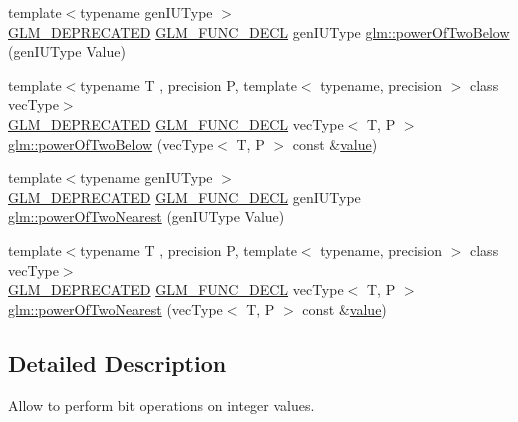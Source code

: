 \begin{DoxyCompactItemize}
\item 
{\footnotesize template$<$typename gen\+I\+U\+Type $>$ }\\\mbox{\hyperlink{setup_8hpp_a8edfb48cdc249a3ee48406bf179023dc}{G\+L\+M\+\_\+\+D\+E\+P\+R\+E\+C\+A\+T\+ED}} \mbox{\hyperlink{setup_8hpp_ab2d052de21a70539923e9bcbf6e83a51}{G\+L\+M\+\_\+\+F\+U\+N\+C\+\_\+\+D\+E\+CL}} gen\+I\+U\+Type \mbox{\hyperlink{group__gtx__bit_ga3de7df63c589325101a2817a56f8e29d}{glm\+::power\+Of\+Two\+Below}} (gen\+I\+U\+Type Value)
\item 
{\footnotesize template$<$typename T , precision P, template$<$ typename, precision $>$ class vec\+Type$>$ }\\\mbox{\hyperlink{setup_8hpp_a8edfb48cdc249a3ee48406bf179023dc}{G\+L\+M\+\_\+\+D\+E\+P\+R\+E\+C\+A\+T\+ED}} \mbox{\hyperlink{setup_8hpp_ab2d052de21a70539923e9bcbf6e83a51}{G\+L\+M\+\_\+\+F\+U\+N\+C\+\_\+\+D\+E\+CL}} vec\+Type$<$ T, P $>$ \mbox{\hyperlink{group__gtx__bit_gae33bb1ca2b55846b23a0f0796a679195}{glm\+::power\+Of\+Two\+Below}} (vec\+Type$<$ T, P $>$ const \&\mbox{\hyperlink{glad_8h_a03aff08f73d7fde3d1a08e0abd8e84fa}{value}})
\item 
{\footnotesize template$<$typename gen\+I\+U\+Type $>$ }\\\mbox{\hyperlink{setup_8hpp_a8edfb48cdc249a3ee48406bf179023dc}{G\+L\+M\+\_\+\+D\+E\+P\+R\+E\+C\+A\+T\+ED}} \mbox{\hyperlink{setup_8hpp_ab2d052de21a70539923e9bcbf6e83a51}{G\+L\+M\+\_\+\+F\+U\+N\+C\+\_\+\+D\+E\+CL}} gen\+I\+U\+Type \mbox{\hyperlink{group__gtx__bit_ga5f65973a5d2ea38c719e6a663149ead9}{glm\+::power\+Of\+Two\+Nearest}} (gen\+I\+U\+Type Value)
\item 
{\footnotesize template$<$typename T , precision P, template$<$ typename, precision $>$ class vec\+Type$>$ }\\\mbox{\hyperlink{setup_8hpp_a8edfb48cdc249a3ee48406bf179023dc}{G\+L\+M\+\_\+\+D\+E\+P\+R\+E\+C\+A\+T\+ED}} \mbox{\hyperlink{setup_8hpp_ab2d052de21a70539923e9bcbf6e83a51}{G\+L\+M\+\_\+\+F\+U\+N\+C\+\_\+\+D\+E\+CL}} vec\+Type$<$ T, P $>$ \mbox{\hyperlink{group__gtx__bit_ga2d7e85995d097518b8d70cd409bda39e}{glm\+::power\+Of\+Two\+Nearest}} (vec\+Type$<$ T, P $>$ const \&\mbox{\hyperlink{glad_8h_a03aff08f73d7fde3d1a08e0abd8e84fa}{value}})
\end{DoxyCompactItemize}


\subsection{Detailed Description}
Allow to perform bit operations on integer values. 

